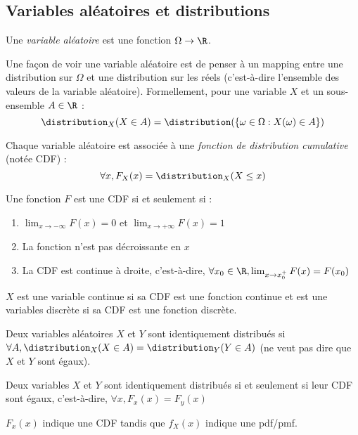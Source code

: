 \subsection{Variables aléatoires et distributions}
    \begin{definition}
        Une \textit{variable aléatoire} est une fonction \(\Omega \to \R\). 
        
        Une façon de voir une variable aléatoire est de penser à un mapping entre une distribution sur \(\Omega\) et une distribution sur les réels (c'est-à-dire l'ensemble des valeurs de la variable aléatoire).
        Formellement, pour une variable \(X\) et un sous-ensemble \(A \in \R\) :
        \[
            \distribution_X (X \in A) = \distribution(\{\omega \in \Omega : X(\omega) \in A\})
        \]
    \end{definition}

    \begin{definition}
        Chaque variable aléatoire est associée à une \textit{fonction de distribution cumulative} (notée CDF) :
        \[
            \forall x, F_X(x) = \distribution_X(X \leq x)
        \]

        Une fonction \(F\) est une CDF si et seulement si :
        \begin{enumerate}
            \item \(\lim_{x \to -\infty} F(x) = 0\) et \(\lim_{x \to +\infty} F(x) = 1\)
            \item La fonction n'est pas décroissante en \(x\)
            \item La CDF est continue à droite, c'est-à-dire, \(\forall x_0 \in \R, \lim_{x \to x_0^+} F(x) = F(x_0)\)
        \end{enumerate}

        \(X\) est une variable continue si sa CDF est une fonction continue et est une variables discrète si sa CDF est une fonction discrète.

        Deux variables aléatoires \(X\) et \(Y\) sont identiquement distribués si \(\forall A, \distribution_X(X \in A) = \distribution_Y(Y \in A)\) (ne veut pas dire que \(X\) et \(Y\) sont égaux).

        Deux variables \(X\) et \(Y\) sont identiquement distribués si et seulement si leur CDF sont égaux, c'est-à-dire, \(\forall x, F_x(x) = F_y(x)\)
    \end{definition}

    \begin{remarque}[Notations]
        \(F_x(x)\) indique une CDF tandis que \(f_X(x)\) indique une pdf/pmf.
    \end{remarque}

